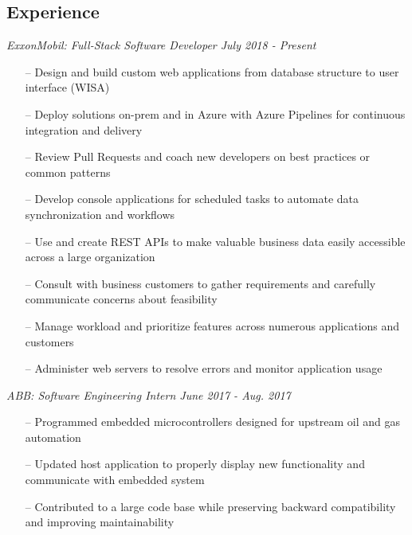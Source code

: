 \documentclass[line,overlapped,9pt]{res}
\begin{document}
\setlength\itemsep{.25em}
\address{23550 Northgate Crossing Boulevard: APT 153 Spring, Texas, 77373}
\address{Mobile: (918)440-3563, Email: kllinzy1@gmail.com}

\begin{resume}

  \section{Experience} {\sl ExxonMobil: Full-Stack Software Developer \hfill July 2018 - \sl Present}
                 \begin{itemize}   %
                 \item[--] Design and build custom web applications from database structure to user interface (WISA)
                 \item[--] Deploy solutions on-prem and in Azure with Azure Pipelines for continuous integration
                   and delivery
                 \item[--] Review Pull Requests and coach new developers on best practices or common patterns
                 \item[--] Develop console applications for scheduled tasks to automate data synchronization
                   and workflows
                 \item[--] Use and create REST APIs to make valuable business data easily accessible across
                   a large organization 
                 \item[--] Consult with business customers to gather requirements and carefully communicate
                   concerns about feasibility
                 \item[--] Manage workload and prioritize features across numerous applications and customers
                \item[--] Administer web servers to resolve errors and monitor application usage
                 \end{itemize}
                 
                 {\sl ABB: Software Engineering Intern  \hfill June 2017 - Aug. 2017 }
                 \begin{itemize}  %
                 \item[--] Programmed embedded microcontrollers designed for upstream
                   oil and gas automation 
                 \item[--] Updated host application to properly display new functionality and
                   communicate with embedded system
                 \item[--] Contributed to a large code base while preserving 
                   backward compatibility and improving maintainability
                 \end{itemize} 


\end{resume}
\end{document}
